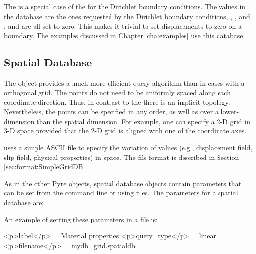 \subsubsection{}

The  is a special case of the  for the Dirichlet
boundary conditions. The values in the database are the ones requested
by the Dirichlet boundary conditions, , ,
and , and are all set to zero. This makes it
trivial to set displacements to zero on a boundary. The examples discussed
in Chapter \vref{cha:examples} use this database.


\subsection{ Spatial Database}

The  object provides a much more efficient query
algorithm than  in cases with a orthogonal grid. The
points do not need to be uniformly spaced along each coordinate
direction. Thus, in contrast to the  there is an
implicit topology. Nevertheless, the points can be specified in any
order, as well as over a lower-dimension than the spatial dimension.
For example, one can specify a 2-D grid in 3-D space provided that the
2-D grid is aligned with one of the coordinate axes.

 uses a simple ASCII file to specify the variation of
values (e.g., displacement field, slip field, physical properties) in
space. The file format is described in Section
\vref{sec:format:SimpleGridDB}.

As in the other Pyre objects, spatial database objects contain parameters
that can be set from the command line or using 
files. The parameters for a spatial database are:
\begin{inventory}
\end{inventory}
An example of setting these parameters in a  file is:
\begin{cfg}
<p>label</p> = Material properties
<p>query_type</p> = linear
<p>filename</p> = mydb_grid.spatialdb
\end{cfg}

